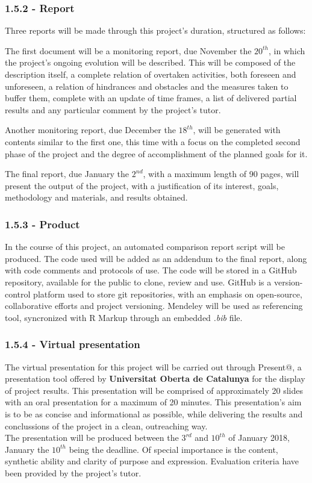 \documentclass[]{article}
\begin{document}
\subsubsection{1.5.2 - Report}\label{report}

Three reports will be made through this project's duration, structured
as follows:

The first document will be a monitoring report, due November the
\(20^{th}\), in which the project's ongoing evolution will be described.
This will be composed of the description itself, a complete relation of
overtaken activities, both foreseen and unforeseen, a relation of
hindrances and obstacles and the measures taken to buffer them, complete
with an update of time frames, a list of delivered partial results and
any particular comment by the project's tutor.

Another monitoring report, due December the \(18^{th}\), will be
generated with contents similar to the first one, this time with a focus
on the completed second phase of the project and the degree of
accomplishment of the planned goals for it.

The final report, due January the \(2^{nd}\), with a maximum length of
90 pages, will present the output of the project, with a justification
of its interest, goals, methodology and materials, and results obtained.

\subsubsection{1.5.3 - Product}\label{product}

In the course of this project, an automated comparison report script
will be produced. The code used will be added as an addendum to the
final report, along with code comments and protocols of use. The code
will be stored in a GitHub repository, available for the public to
clone, review and use. GitHub is a version-control platform used to
store git repositories, with an emphasis on open-source, collaborative
efforts and project versioning. Mendeley will be used as referencing
tool, syncronized with R Markup through an embedded \emph{.bib} file.

\subsubsection{1.5.4 - Virtual presentation}\label{virtual-presentation}

The virtual presentation for this project will be carried out through
Present@, a presentation tool offered by \textbf{Universitat Oberta de
Catalunya} for the display of project results. This presentation will be
comprised of approximately 20 slides with an oral presentation for a
maximum of 20 minutes. This presentation's aim is to be as concise and
informational as possible, while delivering the results and conclussions
of the project in a clean, outreaching way.\\The presentation will be
produced between the \(3^{rd}\) and \(10^{th}\) of January 2018, January
the \(10^{th}\) being the deadline. Of special importance is the
content, synthetic ability and clarity of purpose and expression.
Evaluation criteria have been provided by the project's tutor.
\end{document}
